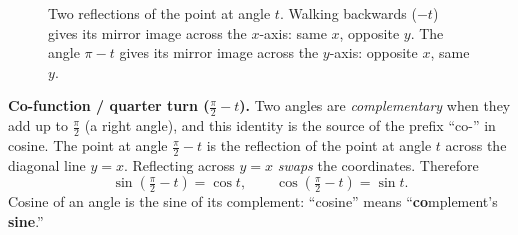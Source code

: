 \begin{figure}[htbp]
\centering
{}
\caption{Two reflections of the point at angle $t$. Walking backwards ($-t$) gives its mirror image across the $x$-axis: same $x$, opposite $y$. The angle $\pi - t$ gives its mirror image across the $y$-axis: opposite $x$, same $y$.}
\label{ch04:fig-reflections}
\end{figure}

\textbf{Co-function / quarter turn ($\tfrac{\pi}{2} - t$).} Two angles are \emph{complementary} when they add up to $\tfrac{\pi}{2}$ (a right angle), and this identity is the source of the prefix ``co-'' in cosine. The point at angle $\tfrac{\pi}{2} - t$ is the reflection of the point at angle $t$ across the diagonal line $y = x$. Reflecting across $y=x$ \emph{swaps} the coordinates. Therefore
\[
  \sin\!\left(\tfrac{\pi}{2} - t\right) = \cos t,\qquad
  \cos\!\left(\tfrac{\pi}{2} - t\right) = \sin t.
\]
Cosine of an angle is the sine of its complement: ``cosine'' means ``\textbf{co}mplement's \textbf{sine}.''

